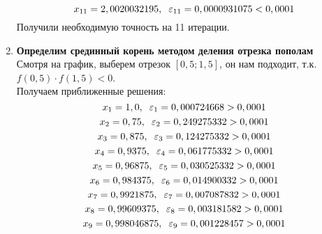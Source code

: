 \documentclass[12pt]{article}
\begin{document}
\begin{enumerate}[label=\textbf{\arabic*})]
\begin{equation*}
\end{equation*}
\begin{equation*}
	x_{11} = 2,0020032195, \hspace{0.2cm}
	\varepsilon_{11} = 0,0000931075 < 0,0001
\end{equation*}
Получили необходимую точность на 11 итерации.
	\item \textbf{Определим срединный корень методом деления отрезка пополам} \\
Смотря на график, выберем отрезок $[0,5; 1,5]$, он нам подходит, т.к. $f(0,5) \cdot f(1,5) < 0 $. \\
Получаем приближенные решения:
\begin{equation*}
	x_1 = 1,0, \hspace{0.2cm}
	\varepsilon_1 = 0,000724668 > 0,0001
\end{equation*}
\begin{equation*}
	x_2 = 0,75, \hspace{0.2cm}
	\varepsilon_2 = 0,249275332 > 0,0001
\end{equation*}
\begin{equation*}
	x_3 = 0,875, \hspace{0.2cm}
	\varepsilon_3 = 0,124275332 > 0,0001
\end{equation*}
\begin{equation*}
	x_4 = 0,9375, \hspace{0.2cm}
	\varepsilon_4 = 0,061775332 > 0,0001
\end{equation*}
\begin{equation*}
	x_5 = 0,96875, \hspace{0.2cm}
	\varepsilon_5 = 0,030525332 > 0,0001
\end{equation*}
\begin{equation*}
	x_6 = 0,984375, \hspace{0.2cm}
	\varepsilon_6 = 0,014900332 > 0,0001
\end{equation*}
\begin{equation*}
	x_7 = 0,9921875, \hspace{0.2cm}
	\varepsilon_7 = 0,007087832 > 0,0001
\end{equation*}
\begin{equation*}
	x_8 = 0,99609375, \hspace{0.2cm}
	\varepsilon_8 = 0,003181582 > 0,0001
\end{equation*}
\begin{equation*}
	x_9 = 0,998046875, \hspace{0.2cm}
	\varepsilon_9 = 0,001228457 > 0,0001

\end{equation*}
\end{enumerate}
\end{document}

